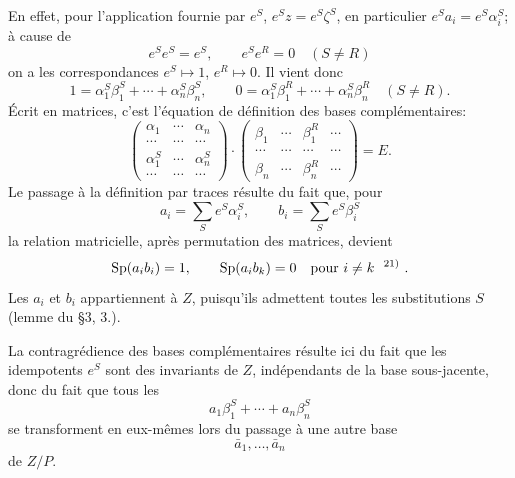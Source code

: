 En effet, pour l'application fournie par \(e^S\), \(e^Sz=e^S\zeta^S\), en particulier \(e^Sa_i=e^S\alpha_i^S\); à cause de
\[
        e^Se^S=e^S,\qquad e^Se^R=0\quad(S\ne R)
\]
on a les correspondances \(e^S\mapsto1\), \(e^R\mapsto0\). Il vient donc
\[
        1=\alpha_1^S\beta_1^S+\cdots+\alpha_n^S\beta_n^S,\qquad
        0=\alpha_1^S\beta_1^R+\cdots+\alpha_n^S\beta_n^R\quad(S\ne R).
\]
Écrit en matrices, c'est l'équation de définition des bases complémentaires:
\[
\begin{pmatrix}
\alpha_1 & \cdots & \alpha_n\\
\cdots & \cdots & \cdots\\
\alpha_1^S & \cdots & \alpha_n^S\\
\cdots & \cdots & \cdots
\end{pmatrix}
\cdot
\begin{pmatrix}
\beta_1 & \cdots & \beta_1^R & \cdots\\
\cdots & \cdots & \cdots & \cdots\\
\beta_n & \cdots & \beta_n^R & \cdots
\end{pmatrix}
=
E.
\]
Le passage à la définition par traces résulte du fait que, pour
\[
        a_i=\sum_S e^S\alpha_i^S,\qquad b_i=\sum_S e^S\beta_i^S
\]
la relation matricielle, après permutation des matrices, devient
\[
        \Sp(a_i b_i)=1,\qquad \Sp(a_i b_k)=0\quad\text{pour }i\ne k\text{\srcfnmark{21)}}.
\]
Les \(a_i\) et \(b_i\) appartiennent à \(Z\), puisqu'ils admettent toutes les substitutions \(S\) (lemme du \S 3, 3.).

La contragrédience des bases complémentaires résulte ici du fait que les idempotents \(e^S\) sont des invariants de \(Z\), indépendants de la base sous-jacente, donc du fait que tous les
\[
        a_1\beta_1^S+\cdots+a_n\beta_n^S
\]
se transforment en eux-mêmes lors du passage à une autre base
\[
        \bar a_1,\ldots,\bar a_n
\]
de \(Z/P\).

\clearpage
